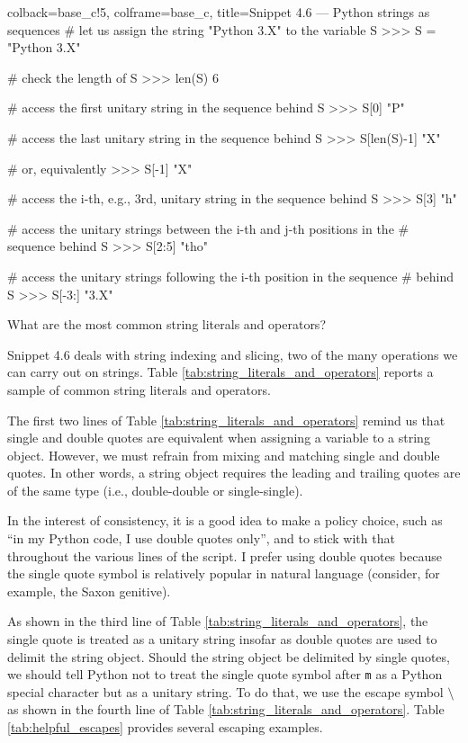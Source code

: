 \documentclass[a4paper,11pt]{book}
\newcommand{\question}[1]{%
    \begin{tcolorbox}[colback=comp_c!10,colframe=comp_c,sidebyside align=top,width=\linewidth,before skip=1ex]
        #1
    \end{tcolorbox}
    \switchcolumn%
}
\newcommand{\note}[1]{%
    \begin{tcolorbox}[colback=white!0,colframe=white!10,width=\linewidth,before skip=1ex]
        #1
    \end{tcolorbox}
}
\begin{document}
\begin{pythoncode}[linenos=true,]{colback=base_c!5, colframe=base_c, title=\sffamily Snippet 4.6 --- Python strings as sequences}
# let us assign the string "Python 3.X" to the variable S
>>> S = "Python 3.X"

# check the length of S
>>> len(S)
6

# access the first unitary string in the sequence behind S 	
>>> S[0]
"P"

# access the last unitary string in the sequence behind S
>>> S[len(S)-1]
"X"

# or, equivalently
>>> S[-1]
"X"

# access the i-th, e.g., 3rd, unitary string in the sequence behind S
>>> S[3]
"h"

# access the unitary strings between the i-th and j-th positions in the 
# sequence behind S
>>> S[2:5]
"tho"

# access the unitary strings following the i-th position in the sequence 
# behind S
>>> S[-3:]
"3.X"

\end{pythoncode}
\clearpage

\begin{paracol}{2}
	\question{\raggedright What are the most common string literals and operators?}
	\note{Snippet 4.6 deals with string indexing and slicing, two of the many operations we can carry out on strings. Table \ref{tab:string_literals_and_operators} reports a sample of common string literals and operators.
	
	\quad The first two lines of Table \ref{tab:string_literals_and_operators} remind us that single and double quotes are equivalent when assigning a variable to a string object. However, we must refrain from mixing and matching single and double quotes. In other words, a string object requires the leading and trailing quotes are of the same type (i.e., double-double or single-single).
	
	\quad In the interest of consistency, it is a good idea to make a policy choice, such as ``in my Python code, I use double quotes only'', and to stick with that throughout the various lines of the script. I prefer using double quotes because the single quote symbol is relatively popular in natural language (consider, for example, the Saxon genitive).
	
	\quad As shown in the third line of Table \ref{tab:string_literals_and_operators}, the single quote is treated as a unitary string insofar as double quotes are used to delimit the string object. Should the string object be delimited by single quotes, we should tell Python not to treat the single quote symbol after \texttt{m} as a Python special character but as a unitary string. To do that, we use the escape symbol $\setminus$  as shown in the fourth line of Table \ref{tab:string_literals_and_operators}. Table \ref{tab:helpful_escapes} provides several escaping examples.}
\end{paracol}
\end{document}
